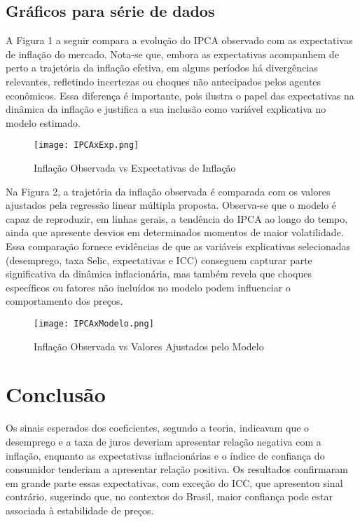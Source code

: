 \documentclass[12pt,oneside]{abntex2}
\begin{document}
\subsection{\textbf{Gráficos para série de dados}}

A Figura 1 a seguir compara a evolução do IPCA observado com as expectativas de inflação do mercado. Nota-se que, embora as expectativas acompanhem de perto a trajetória da inflação efetiva, em alguns períodos há divergências relevantes, refletindo incertezas ou choques não antecipados pelos agentes econômicos. Essa diferença é importante, pois ilustra o papel das expectativas na dinâmica da inflação e justifica a sua inclusão como variável explicativa no modelo estimado.

\begin{figure}[htbp]
    \centering
    \caption{Inflação Observada vs Expectativas de Inflação}
    \texttt{[image: IPCAxExp.png]}
    \label{fig:IPCA-ExpIPCA}
\end{figure}


Na Figura 2, a trajetória da inflação observada é comparada com os valores ajustados pela regressão linear múltipla proposta. Observa-se que o modelo é capaz de reproduzir, em linhas gerais, a tendência do IPCA ao longo do tempo, ainda que apresente desvios em determinados momentos de maior volatilidade. Essa comparação fornece evidências de que as variáveis explicativas selecionadas (desemprego, taxa Selic, expectativas e ICC) conseguem capturar parte significativa da dinâmica inflacionária, mas também revela que choques específicos ou fatores não incluídos no modelo podem influenciar o comportamento dos preços.

\begin{figure}[htbp]
    \centering
    \caption{Inflação Observada vs Valores Ajustados pelo Modelo}
    \texttt{[image: IPCAxModelo.png]}
    \label{fig:IPCA-ExpIPCA}
\end{figure}

\section{\textbf{Conclusão}}

Os sinais esperados dos coeficientes, segundo a teoria, indicavam que o desemprego e a taxa de juros deveriam apresentar relação negativa com a inflação, enquanto as expectativas inflacionárias e o índice de confiança do consumidor tenderiam a apresentar relação positiva. Os resultados confirmaram em grande parte essas expectativas, com exceção do ICC, que apresentou sinal contrário, sugerindo que, no contextos do Brasil, maior confiança pode estar associada à estabilidade de preços. 
\end{document}
